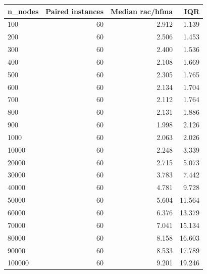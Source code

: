 \begin{tabular}{lrrr}
\toprule
n\_nodes & Paired instances & Median rac/hfma & IQR \\
\midrule
100 & 60 & 2.912 & 1.139 \\
200 & 60 & 2.506 & 1.453 \\
300 & 60 & 2.400 & 1.536 \\
400 & 60 & 2.108 & 1.669 \\
500 & 60 & 2.305 & 1.765 \\
600 & 60 & 2.134 & 1.704 \\
700 & 60 & 2.112 & 1.764 \\
800 & 60 & 2.131 & 1.886 \\
900 & 60 & 1.998 & 2.126 \\
1000 & 60 & 2.063 & 2.026 \\
10000 & 60 & 2.248 & 3.339 \\
20000 & 60 & 2.715 & 5.073 \\
30000 & 60 & 3.783 & 7.442 \\
40000 & 60 & 4.781 & 9.728 \\
50000 & 60 & 5.604 & 11.564 \\
60000 & 60 & 6.376 & 13.379 \\
70000 & 60 & 7.041 & 15.134 \\
80000 & 60 & 8.158 & 16.603 \\
90000 & 60 & 8.533 & 17.789 \\
100000 & 60 & 9.201 & 19.246 \\
\bottomrule
\end{tabular}
